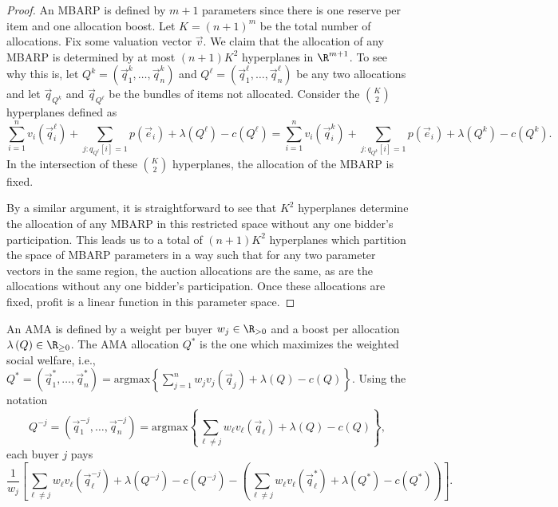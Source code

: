  \begin{proof}
An MBARP is defined by $m+1$ parameters since there is one reserve per item and one allocation boost. Let $K = (n+1)^m$ be the total number of allocations. 
Fix some valuation vector $\vec{v}$. We claim that the allocation of any MBARP is determined by at most $(n+1)K^2$ hyperplanes in $\R^{m+1}$. To see why this is, let $Q^k = \left(\vec{q}_1^k, \dots, \vec{q}_n^k\right)$ and $Q^{\ell} = \left(\vec{q}_1^{\ell}, \dots, \vec{q}_n^{\ell}\right)$ be any two allocations and let $\vec{q}_{Q^k}$ and $\vec{q}_{Q^{\ell}}$ be the bundles of items not allocated. Consider the ${K \choose 2}$ hyperplanes defined as \[\sum_{i = 1}^n v_i\left(\vec{q}_i^{\ell}\right) + \sum_{j : q_{Q^{\ell}}[i] = 1} p\left(\vec{e}_i\right) + \lambda\left(Q^{\ell}\right) - c\left(Q^{\ell}\right) = \sum_{i = 1}^n v_i\left(\vec{q}_i^{k}\right) + \sum_{j : q_{Q^{k}}[i] = 1} p\left(\vec{e}_i\right) + \lambda\left(Q^{k}\right) - c\left(Q^{k}\right).\] In the intersection of these ${K \choose 2}$ hyperplanes, the allocation of the MBARP is fixed.

By a similar argument, it is straightforward to see that $K^2$ hyperplanes determine the allocation of any MBARP in this restricted space without any one bidder's participation. This leads us to a total of $(n+1)K^2$ hyperplanes which partition the space of MBARP parameters in a way such that for any two parameter vectors in the same region, the auction allocations are the same, as are the allocations without any one bidder's participation.  Once these allocations are fixed, profit is a linear function in this parameter space.
\end{proof}

\begin{definition}\label{def:AMA}
	An AMA is defined by a weight per buyer $w_j \in \R_{> 0}$ and a boost per allocation $\lambda\left(Q\right) \in \R_{\geq 0}$. The AMA allocation $Q^*$ is the one which maximizes the weighted social welfare, i.e., $Q^* =   \left(\vec{q}_1^*, \dots, \vec{q}_n^*\right) = \text{argmax}\left\{\sum_{j = 1}^n w_jv_j\left(\vec{q}_j\right) + \lambda\left(Q\right) - c\left(Q\right)\right\}.$ Using the notation \[Q^{-j} = \left(\vec{q}_1^{-j}, \dots, \vec{q}_n^{-j}\right) = \text{argmax}\left\{ \sum_{\ell \not= j} w_{\ell}v_{\ell}\left(\vec{q}_{\ell}\right) + \lambda\left(Q\right) - c\left(Q\right)\right\},\] each buyer $j$ pays 
	\[\frac{1}{w_j}\left[ \sum_{\ell \not= j} w_{\ell}v_{\ell}\left(\vec{q}_{\ell}^{-j}\right) + \lambda\left(Q^{-j}\right) - c\left(Q^{-j}\right)-\left(\sum_{\ell \not= j} w_{\ell} v_{\ell}\left(\vec{q}^*_{\ell}\right) +\lambda\left(Q^*\right) - c\left(Q^*\right)\right)\right].\]
	\end{definition}

